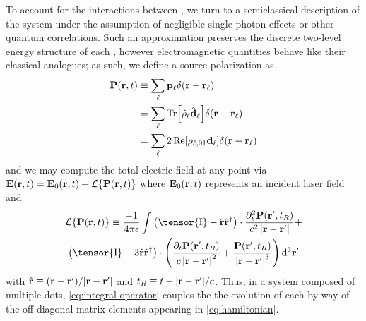 To account for the interactions between \qds{}, we turn to a semiclassical description of the system under the assumption of negligible single-photon effects or other quantum correlations.
Such an approximation preserves the discrete two-level energy structure of each \qd{}, however electromagnetic quantities behave like their classical analogues;
as such, we define a source polarization as
\begin{equation}
  \begin{aligned}
    \vb{P}(\vb{r}, t) &\equiv \sum_\ell \vb{p}_\ell \delta(\vb{r} - \vb{r}_\ell) \\
                      &= \sum_\ell \Tr[\hat{\rho}_\ell \hat{\vb{d}}_\ell] \delta(\vb{r} - \vb{r}_\ell) \\
                      &= \sum_\ell 2 \Re[\rho_{\ell,01}\vb{d}_\ell]\delta(\vb{r} - \vb{r}_\ell) \\
  \end{aligned}
\end{equation}
and we may compute the total electric field at any point via $\vb{E}(\vb{r}, t) = \vb{E}_0(\vb{r}, t) + \mathcal{L}\{\vb{P}(\vb{r}, t)\}$
where $\vb{E}_0(\vb{r}, t)$ represents an incident laser field and
\begin{equation}
  \begin{gathered}
    \mathcal{L}\{\vb{P}(\vb{r}, t)\} \equiv
      \frac{-1}{4\pi \epsilon} \int
      \left(\tensor{\mathrm{I}} -  \hat{\mathbf{r}}\hat{\mathbf{r}}^\dagger\right) \cdot \frac{\partial_t^2 \mathbf{P}(\mathbf{r}', t_R)}{c^2 \left|\mathbf{r}-\mathbf{r}'\right|} + \\
      \left(\tensor{\mathrm{I}} - 3\hat{\mathbf{r}}\hat{\mathbf{r}}^\dagger\right) \cdot \qty(
        \frac{\partial_t   \mathbf{P}(\mathbf{r}', t_R)}{c   \left|\mathbf{r}-\mathbf{r}'\right|^2} +
        \frac{             \mathbf{P}(\mathbf{r}', t_R)}{    \left|\mathbf{r}-\mathbf{r}'\right|^3}
      )
    \, \mathrm{d}^3 \mathbf{r'}
  \end{gathered}
  \label{eq:integral operator}
\end{equation}
with $\hat{\vb{r}} \equiv \qty(\vb{r} - \vb{r}')/\abs{\vb{r} - \vb{r}'}$ and $t_R \equiv t - \abs{\vb{r} - \vb{r}'}/c$.
Thus, in a system composed of multiple dots, \cref{eq:integral operator} couples the the evolution of each \qd{} by way of the off-diagonal matrix elements appearing in \cref{eq:hamiltonian}.

